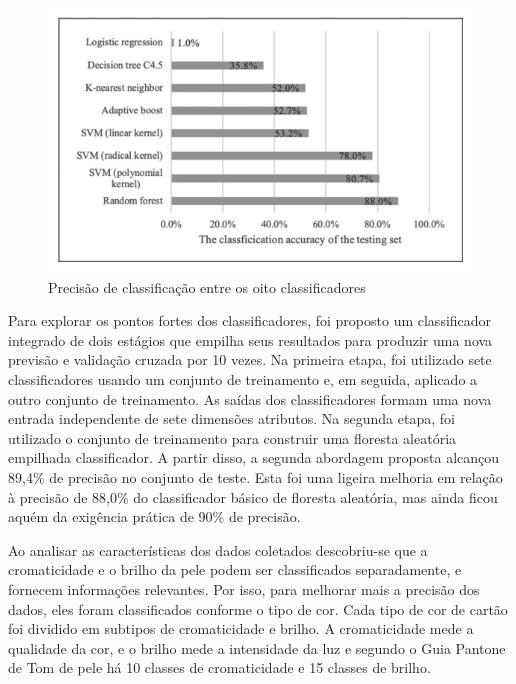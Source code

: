 \begin{figure}[h]
\centering
\caption{Precisão de classificação entre os oito classificadores}
\includegraphics{Template_Latex_TCC-UNIFTEC/_lib/imagens/resultados_facial_skin.png}

\label{fig:x classificacao}
\end{figure}

Para explorar os pontos fortes dos classificadores, foi proposto um classificador integrado de dois estágios que empilha seus resultados para produzir uma nova previsão e validação cruzada por 10 vezes. Na primeira etapa, foi utilizado sete classificadores usando um conjunto de treinamento e, em seguida, aplicado a outro conjunto de treinamento. As saídas dos classificadores formam uma nova entrada independente de sete dimensões atributos.  Na segunda etapa, foi utilizado o conjunto de treinamento para construir uma floresta aleatória empilhada classificador. A partir disso, a segunda abordagem proposta alcançou 89,4\% de precisão no conjunto de teste. Esta foi uma ligeira melhoria em relação à precisão de 88,0\% do classificador básico de floresta aleatória, mas ainda ficou aquém da exigência prática de 90\% de precisão.

Ao analisar as características dos dados coletados descobriu-se que a cromaticidade e o brilho da pele podem ser classificados separadamente, e fornecem informações relevantes. Por isso, para melhorar mais a precisão  dos dados, eles foram classificados conforme o tipo de cor. Cada tipo de cor de cartão foi dividido em subtipos de cromaticidade e brilho. A cromaticidade mede a qualidade da cor, e o brilho mede a intensidade da luz e segundo o Guia Pantone de Tom de pele há 10 classes de cromaticidade e 15 classes de brilho.

